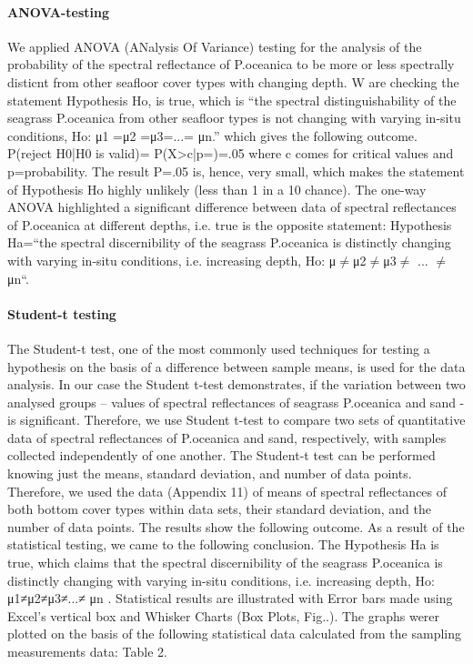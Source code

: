 \documentclass[10pt, a4paper]{article}
\begin{document}
\paragraph{ANOVA-testing}
We applied ANOVA (ANalysis Of Variance) testing for the analysis of the probability of the
spectral reflectance of P.oceanica to be more or less spectrally disticnt from other seafloor cover
types with changing depth. W are checking the statement Hypothesis Ho, is true, which is “the
spectral distinguishability of the seagrass P.oceanica from other seafloor types is not changing with
varying in-situ conditions, Ho: μ1 =μ2 =μ3=...= μn.” which gives the following outcome.
P(reject H0|H0 is valid)= P(X>c|p=)=.05
where c comes for critical values and p=probability.
The result P=.05 is, hence, very small, which makes the statement of Hypothesis Ho highly unlikely
(less than 1 in a 10 chance). The one-way ANOVA highlighted a significant difference between data
of spectral reflectances of P.oceanica at different depths, i.e. true is the opposite statement:
Hypothesis Ha=“the spectral discernibility of the seagrass P.oceanica is distinctly changing with
varying in-situ conditions, i.e. increasing depth, Ho: μ$\neq$μ2$\neq$μ3$\neq$ ... $\neq$μn“.

\paragraph{Student-t testing}
The Student-t test, one of the most commonly used techniques for testing a hypothesis on the basis
of a difference between sample means, is used for the data analysis. In our case the Student t-test demonstrates, if the variation
between two analysed groups – values of spectral reflectances of seagrass P.oceanica and sand - is
significant. Therefore, we use Student t-test to compare two sets of quantitative data of spectral
reflectances of P.oceanica and sand, respectively, with samples collected independently of one
another. The Student-t test can be performed knowing just the means, standard deviation, and number
of data points. Therefore, we used the data (Appendix 11) of means of spectral reflectances of both
bottom cover types within data sets, their standard deviation, and the number of data points.
The results show the following outcome.
As a result of the statistical testing, we came to the following conclusion.
The Hypothesis Ha is true, which claims that the spectral discernibility of the seagrass P.oceanica is
distinctly changing with varying in-situ conditions, i.e. increasing depth, Ho: μ1≠μ2≠μ3≠...≠ μn .
Statistical results are illustrated with Error bars made using Excel's vertical box and Whisker Charts
(Box Plots, Fig..).
The graphs werer plotted on the basis of the following statistical data calculated from the sampling
measurements data: Table 2.
\end{document}
